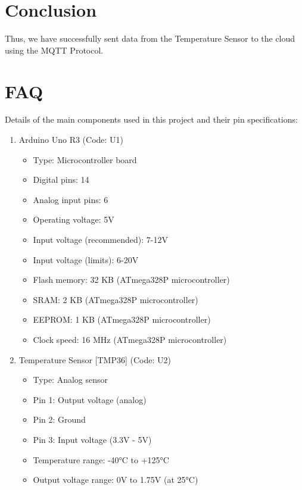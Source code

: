 \documentclass[11pt]{article}
\begin{document}
\section{Conclusion}
Thus, we have successfully sent data from the Temperature Sensor to the cloud using the MQTT Protocol.
\clearpage

\section{FAQ}

Details of the main components used in this project and their pin specifications:

\begin{enumerate}
	\item Arduino Uno R3 (Code: U1)
	      \begin{itemize}
		      \item Type: Microcontroller board
		      \item Digital pins: 14
		      \item Analog input pins: 6
		      \item Operating voltage: 5V
		      \item Input voltage (recommended): 7-12V
		      \item Input voltage (limits): 6-20V
		      \item Flash memory: 32 KB (ATmega328P microcontroller)
		      \item SRAM: 2 KB (ATmega328P microcontroller)
		      \item EEPROM: 1 KB (ATmega328P microcontroller)
		      \item Clock speed: 16 MHz (ATmega328P microcontroller)
	      \end{itemize}
	\item Temperature Sensor [TMP36] (Code: U2)
	      \begin{itemize}
		      \item Type: Analog sensor
		      \item Pin 1: Output voltage (analog)
		      \item Pin 2: Ground
		      \item Pin 3: Input voltage (3.3V - 5V)
		      \item Temperature range: -40°C to +125°C
		      \item Output voltage range: 0V to 1.75V (at 25°C)


\end{itemize}
\end{enumerate}
\end{document}
